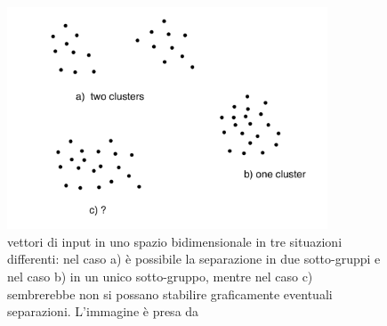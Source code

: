 \begin{figure}[h!]
	\centering
	\includegraphics[width=0.85\textwidth]{figs/Unsup_learning.png}
	\caption{vettori di input in uno spazio bidimensionale in tre situazioni differenti: nel caso a) è possibile la separazione in due sotto-gruppi e nel caso b) in un unico sotto-gruppo, mentre nel caso c) sembrerebbe non si possano stabilire graficamente eventuali separazioni. L'immagine è presa da \cite{IntroML}}
	\label{Unsup}
\end{figure}

